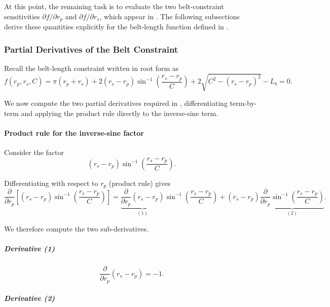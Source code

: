 \documentclass[11pt]{article}
\numberwithin{equation}{section}
\begin{document}
At this point, the remaining task is to evaluate the two belt-constraint
sensitivities
$\partial f/\partial r_p$ and $\partial f/\partial r_s$, which appear in
. The following subsections derive these quantities
explicitly for the belt-length function defined in .

\subsubsection{Partial Derivatives of the Belt Constraint}
\label{sec:belt_partials}

Recall the belt-length constraint written in root form as
\begin{equation}
f(r_p,r_s,C)
=
\pi(r_p+r_s)
+2(r_s-r_p)\sin^{-1}\!\left(\frac{r_s-r_p}{C}\right)
+2\sqrt{C^2-(r_s-r_p)^2}
-L_b
=0.
\label{eq:f_def_again}
\end{equation}

We now compute the two partial derivatives required in
, differentiating term-by-term and applying the
product rule directly to the inverse-sine term.

\paragraph{Product rule for the inverse-sine factor}

Consider the factor
\[
(r_s-r_p)\sin^{-1}\!\left(\frac{r_s-r_p}{C}\right).
\]

Differentiating with respect to $r_p$ (product rule) gives
\begin{equation}
\frac{\partial}{\partial r_p}
\left[
(r_s-r_p)\sin^{-1}\!\left(\frac{r_s-r_p}{C}\right)
\right]
=
\underbrace{\frac{\partial}{\partial r_p}(r_s-r_p)}_{(1)}
\sin^{-1}\!\left(\frac{r_s-r_p}{C}\right)
+
(r_s-r_p)
\underbrace{\frac{\partial}{\partial r_p}\sin^{-1}\!\left(\frac{r_s-r_p}{C}\right)}_{(2)}.
\label{eq:prod_rule_asin_rp}
\end{equation}

We therefore compute the two sub-derivatives.

\subparagraph{Derivative (1)}

\begin{equation}
\frac{\partial}{\partial r_p}(r_s-r_p) = -1.
\label{eq:dlinear_rp}
\end{equation}

\subparagraph{Derivative (2)}
\end{document}
